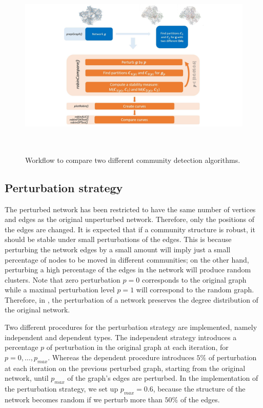 \begin{figure}[h!]
\centering
\includegraphics[width=.9\textwidth, height=9cm]{Figure2.png}
\caption{\label{fig:Flowchart2} Workflow to compare two different community detection algorithms.}
\end{figure}

\subsection{Perturbation strategy}
The perturbed network has been restricted to have the same number of vertices and edges as the original unperturbed network. Therefore, only the positions of the edges are changed. It is expected that if a community structure is robust, it should be stable under small perturbations of the edges. This is because perturbing the network edges by a small amount will imply just a small percentage of nodes to be moved in different communities; on the other hand, perturbing a high percentage of the edges in the network will produce random clusters. Note that zero perturbation $p=0$ corresponds to the original graph while a maximal perturbation level $p=1$ will correspond to the random graph. Therefore, in , the perturbation of a network preserves the degree distribution of the original network. 

Two different procedures for the perturbation strategy are implemented, namely independent and dependent types. The independent strategy introduces a percentage $p$ of perturbation in the original graph at each iteration, for $p=0,\dots,p_{max}$. Whereas the dependent procedure introduces $5\%$ of perturbation at each iteration on the previous perturbed graph, starting from the original network, until $p_{max}$ of the graph's edges are perturbed. In the implementation of the perturbation strategy, we set up $p_{max}=0.6$, because the structure of the network becomes random if we perturb more than $50\%$ of the edges. 

